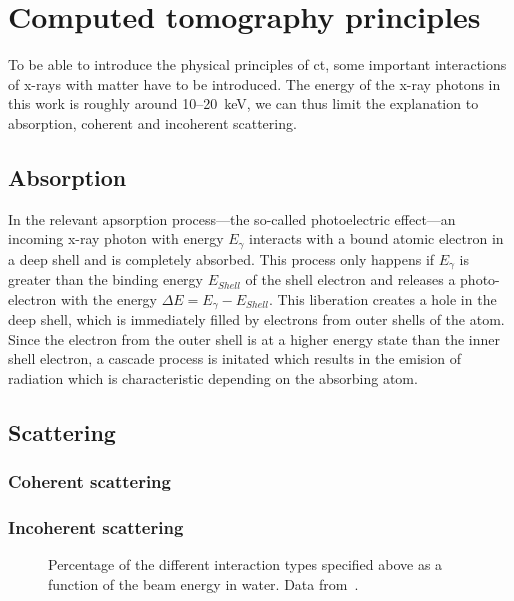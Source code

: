 \section{Computed tomography principles}
To be able to introduce the physical principles of \ac{ct}, some important interactions of x-rays with matter have to be introduced. The energy of the x-ray photons in this work is roughly around 10--\SI{20}{\kilo\electronvolt}, we can thus limit the explanation to absorption, coherent and incoherent scattering.

\subsection{Absorption}
In the relevant apsorption process---the so-called photoelectric effect---an incoming x-ray photon with energy $E_{\gamma}$ interacts with a bound atomic electron in a deep shell and is completely absorbed. This process only happens if $E_{\gamma}$ is greater than the binding energy $E_{Shell}$ of the shell electron and releases a photo-electron with the energy $\Delta E=E_{\gamma}-E_{Shell}$. This liberation creates a hole in the deep shell, which is immediately filled by electrons from outer shells of the atom. Since the electron from the outer shell is at a higher energy state than the inner shell electron, a cascade process is initated which results in the emision of radiation which is characteristic depending on the absorbing atom.

\subsection{Scattering}
\subsubsection{Coherent scattering}
\subsubsection{Incoherent scattering}

\begin{figure}
	\caption{Percentage of the different interaction types specified above as a function of the beam energy in water. Data from~\cite[Table 5-5]{Johns1983}.}
	\label{fig:sinogram}
\end{figure}

